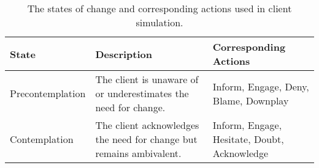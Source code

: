 \begin{table*}[tb]
\centering
\begin{tabularx}{\textwidth}{lXp{4cm}}
\toprule
State            & Description                                                                                                                                  & Corresponding Actions                                    \\ \midrule
Precontemplation & The client is unaware of or underestimates the need for change.           & Inform, Engage, Deny, \newline Blame, Downplay     \\ \hline
Contemplation    & The client acknowledges the need for change but remains ambivalent.     & Inform, Engage, Hesitate, \newline  Doubt, Acknowledge   
\\ \bottomrule
\end{tabularx}
\caption{The states of change and corresponding actions used in client simulation.}
\label{tab:state description}
\end{table*}

